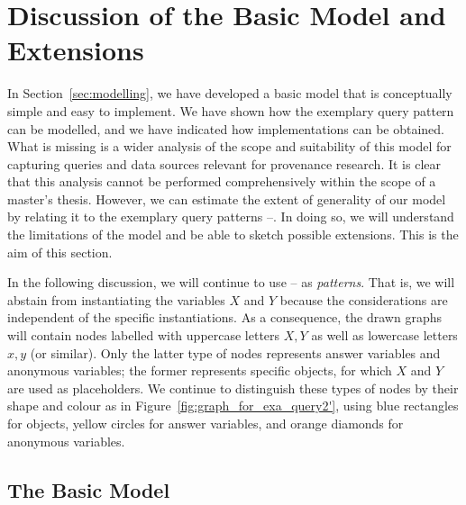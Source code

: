 \section{Discussion of the Basic Model and Extensions}
\label{sec:modelling_discussion}

In Section~\ref{sec:modelling}, we have developed a basic model
that is conceptually simple and easy to implement.
We have shown how the exemplary query pattern 
can be modelled, and we have indicated how implementations can be obtained.
What is missing is a wider analysis of the scope and suitability
of this model for capturing queries and data sources relevant
for provenance research.
It is clear that this analysis cannot be performed comprehensively
within the scope of a master's thesis.
However, we can estimate the extent of generality of our model
by relating it to the exemplary query patterns --.
In doing so, we will understand the limitations of the model
and be able to sketch possible extensions.
This is the aim of this section.

In the following discussion, we will continue to use --
as \emph{patterns}. That is, we will abstain from instantiating the variables $X$ and $Y$
because the considerations are independent of the specific instantiations.
As a consequence, the drawn graphs will contain nodes labelled with uppercase letters $X,Y$
as well as lowercase letters $x,y$ (or similar).
Only the latter type of nodes represents answer variables and anonymous variables;
the former represents specific objects, for which $X$ and $Y$ are used as placeholders.
We continue to distinguish these types of nodes by their shape and colour as in Figure~\ref{fig:graph_for_exa_query2'},
using blue rectangles for objects, yellow circles for answer variables, and orange diamonds 
for anonymous variables.

\subsection{The Basic Model}

